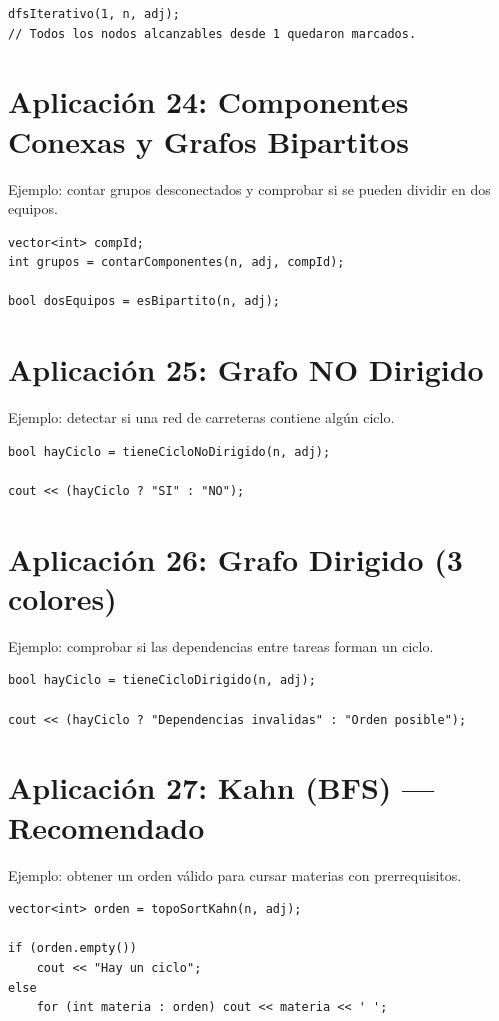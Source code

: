 \documentclass[10pt,twocolumn,letterpaper]{report}
\begin{document}
\begin{lstlisting}
dfsIterativo(1, n, adj);
// Todos los nodos alcanzables desde 1 quedaron marcados.
\end{lstlisting}

\section{Aplicación 24: Componentes Conexas y Grafos Bipartitos}
Ejemplo: contar grupos desconectados y comprobar si se pueden dividir en dos equipos.

\begin{lstlisting}
vector<int> compId;
int grupos = contarComponentes(n, adj, compId);

bool dosEquipos = esBipartito(n, adj);
\end{lstlisting}

\section{Aplicación 25: Grafo NO Dirigido}
Ejemplo: detectar si una red de carreteras contiene algún ciclo.

\begin{lstlisting}
bool hayCiclo = tieneCicloNoDirigido(n, adj);

cout << (hayCiclo ? "SI" : "NO");
\end{lstlisting}

\section{Aplicación 26: Grafo Dirigido (3 colores)}
Ejemplo: comprobar si las dependencias entre tareas forman un ciclo.

\begin{lstlisting}
bool hayCiclo = tieneCicloDirigido(n, adj);

cout << (hayCiclo ? "Dependencias invalidas" : "Orden posible");
\end{lstlisting}

\section{Aplicación 27: Kahn (BFS) --- Recomendado}
Ejemplo: obtener un orden válido para cursar materias con prerrequisitos.

\begin{lstlisting}
vector<int> orden = topoSortKahn(n, adj);

if (orden.empty())
    cout << "Hay un ciclo";
else
    for (int materia : orden) cout << materia << ' ';
\end{lstlisting}
\end{document}
